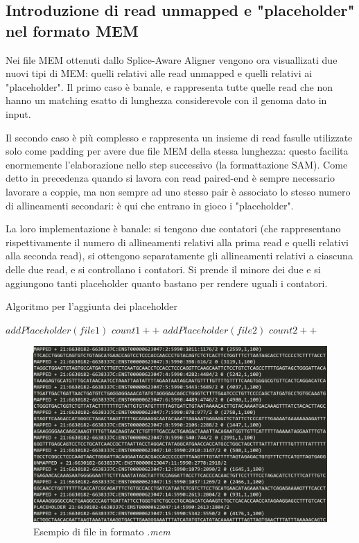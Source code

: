 \subsection{Introduzione di read unmapped e "placeholder" nel formato MEM}
Nei file MEM ottenuti dallo Splice-Aware Aligner vengono ora visuallizati due nuovi tipi di MEM: quelli relativi alle read unmapped e quelli relativi ai "placeholder". Il primo caso è banale, e rappresenta tutte quelle read che non hanno un matching esatto di lunghezza considerevole con il genoma dato in input.

Il secondo caso è più complesso e rappresenta un insieme di read fasulle utilizzate solo come padding per avere due file MEM della stessa lunghezza: questo facilita enormemente l'elaborazione nello step successivo (la formattazione SAM). Come detto in precedenza quando si lavora con read paired-end è sempre necessario lavorare a coppie, ma non sempre ad uno stesso pair è associato lo stesso numero di allineamenti secondari: è qui che entrano in gioco i "placeholder". 

La loro implementazione è banale: si tengono due contatori (che rappresentano rispettivamente il numero di allineamenti relativi alla prima read e quelli relativi alla seconda read), si ottengono separatamente gli allineamenti relativi a ciascuna delle due read, e si controllano i contatori. Si prende il minore dei due e si aggiungono tanti placeholder quanto bastano per rendere uguali i contatori.

\newpage

\begin{algorithm}[h!]
\caption{Algoritmo per l'aggiunta dei placeholder}\label{placeholder}
\begin{algorithmic}[1]
			\State $addPlaceholder(file1)$
			\State $count1++$
		\Else
			\State $addPlaceholder(file2)$
			\State $count2++$
		\EndIf
	\EndWhile
\EndProcedure
\end{algorithmic}
\end{algorithm}

\begin{figure}[h!]
	\centering
	\includegraphics[width=\linewidth]{images/tipiMEM3.png}
  \caption{Esempio di file in formato \textit{.mem}}
  \label{fig:MEMTypes}
\end{figure}

